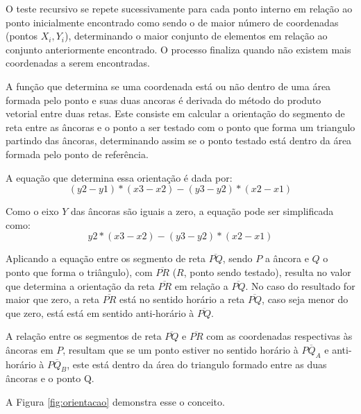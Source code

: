 \documentclass[12pt,a4paper]{article}
\begin{document}
O teste recursivo se repete sucessivamente para cada ponto interno em relação ao ponto inicialmente encontrado como sendo o de maior número de coordenadas (pontos $X_i,Y_i$), determinando o maior conjunto de elementos em relação ao conjunto anteriormente encontrado. O processo finaliza quando não existem mais coordenadas a serem encontradas.

A função que determina se uma coordenada está ou não dentro de uma área formada pelo ponto e suas duas ancoras é derivada do método do produto vetorial entre duas retas.\cite{jules:test} Este consiste em calcular a orientação do segmento de reta entre as âncoras e o ponto a ser testado com o ponto que forma um triangulo partindo das âncoras, determinando assim se o ponto testado está dentro da área formada pelo ponto de referência.

A equação que determina essa orientação é dada por:
\[(y2-y1)*(x3-x2) - (y3-y2)*(x2-x1)\]

Como o eixo $Y$ das âncoras são iguais a zero, a equação pode ser simplificada como: \[y2*(x3-x2) - (y3-y2)*(x2-x1)\]

Aplicando a equação entre os segmento de reta $\overline{PQ}$, sendo $P$ a âncora e $Q$ o ponto que forma o triângulo), com $\overline{PR}$ ($R$, ponto sendo testado), resulta no valor que determina a orientação da reta $\overline{PR}$ em relação a $\overline{PQ}$. No caso do resultado for maior que zero, a reta $\overline{PR}$ está no sentido horário a reta $\overline{PQ}$, caso seja menor do que zero, está está em sentido anti-horário à  $\overline{PQ}$.

A relação entre os segmentos de reta $\overline{PQ}$ e $\overline{PR}$ com as coordenadas respectivas às âncoras em $P$, resultam que se um ponto estiver no sentido horário à $\overline{PQ_A}$ e anti-horário à $\overline{PQ_B}$, este está dentro da área do triangulo formado entre as duas âncoras e o ponto Q.

A Figura \ref{fig:orientacao} demonstra esse o conceito.
\end{document}
